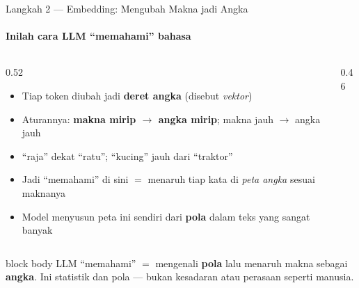 \documentclass[aspectratio=169,t]{beamer}
\begin{document}
\begin{frame}{Langkah 2 --- Embedding: Mengubah Makna jadi Angka}
  \framesubtitle{Inilah cara LLM ``memahami'' bahasa}
  \begin{columns}[T]
    \begin{column}{0.52\textwidth}
      \begin{itemize}
        \footnotesize
        \item Tiap token diubah jadi \textbf{deret angka} (disebut \emph{vektor})
        \item Aturannya: \textbf{makna mirip $\to$ angka mirip}; makna jauh $\to$ angka jauh
        \item ``raja'' dekat ``ratu''; ``kucing'' jauh dari ``traktor''
        \item Jadi ``memahami'' di sini $=$ menaruh tiap kata di \emph{peta angka} sesuai maknanya
        \item Model menyusun peta ini sendiri dari \textbf{pola} dalam teks yang sangat banyak
      \end{itemize}
    \end{column}
    \begin{column}{0.46\textwidth}
      \centering
    \end{column}
  \end{columns}
  \vspace{0.2em}
  \begin{beamercolorbox}[rounded=true,shadow=false,sep=4pt]{block body}
    \small\color{white}
    LLM ``memahami'' $=$ mengenali \textbf{pola} lalu menaruh makna sebagai \textbf{angka}. Ini statistik dan pola --- bukan kesadaran atau perasaan seperti manusia.
  \end{beamercolorbox}
\end{frame}
\end{document}
